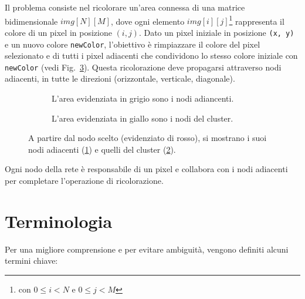 \documentclass[12pt, a4paper]{report}
\begin{document}
Il problema consiste nel ricolorare un'area connessa di una matrice bidimensionale $img[N][M]$, dove ogni elemento $img[i][j]$\footnote{con $0 \le i < N$ e $0 \le j < M$} rappresenta il colore di un pixel in posizione $(i,j)$. Dato un pixel iniziale in posizione \texttt{(x, y)} e un nuovo colore \texttt{newColor}, l'obiettivo \`e rimpiazzare il colore del pixel selezionato e di tutti i pixel adiacenti che condividono lo stesso colore iniziale con \texttt{newColor} (vedi Fig.~\ref{fig:esempio_nodi}). Questa ricolorazione deve propagarsi attraverso nodi adiacenti, in tutte le direzioni (orizzontale, verticale, diagonale).

\begin{figure}[H]
    \captionsetup{justification=centering, margin=2cm}
    \centering
    \begin{subfigure}{0.48\textwidth}
        \captionsetup{justification=centering, margin=1cm}
        \centering
        
        \caption{L'area evidenziata in grigio sono i nodi adiancenti.}
        \label{fig:nodi_adiacenti}
    \end{subfigure}
    \hfill
    \begin{subfigure}{0.48\textwidth}
        \captionsetup{justification=centering, margin=1cm}
        \centering
        
        \caption{L'area evidenziata in giallo sono i nodi del cluster.}
        \label{fig:nodi_cluster}
    \end{subfigure}
    \caption{A partire dal nodo scelto (evidenziato di rosso), si mostrano i suoi nodi adiacenti (\ref{fig:nodi_adiacenti}) e quelli del cluster (\ref{fig:nodi_cluster}).}
    \label{fig:esempio_nodi}
\end{figure}


Ogni nodo della rete \`e responsabile di un pixel e collabora con i nodi adiacenti per completare l'operazione di ricolorazione.

\section{Terminologia}

Per una migliore comprensione e per evitare ambiguit\`a, vengono definiti alcuni termini chiave:
\end{document}
